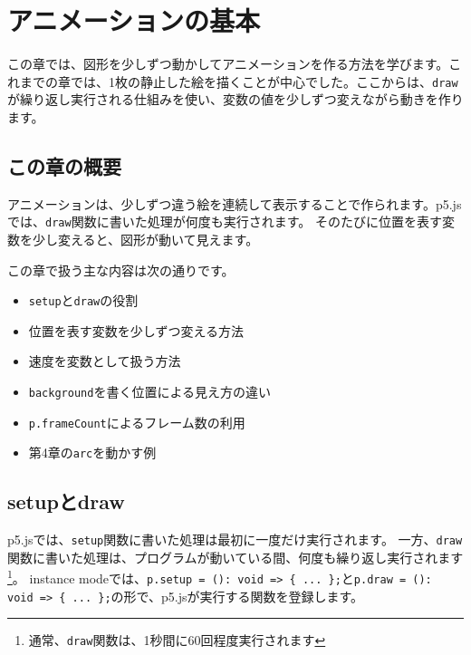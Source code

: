 \chapter{アニメーションの基本}
\label{chap:animation-basics}

この章では、図形を少しずつ動かしてアニメーションを作る方法を学びます。これまでの章では、1枚の静止した絵を描くことが中心でした。ここからは、\texttt{draw}が繰り返し実行される仕組みを使い、変数の値を少しずつ変えながら動きを作ります。

\section{この章の概要}

アニメーションは、少しずつ違う絵を連続して表示することで作られます。p5.jsでは、\texttt{draw}関数に書いた処理が何度も実行されます。
そのたびに位置を表す変数を少し変えると、図形が動いて見えます。

この章で扱う主な内容は次の通りです。

\begin{itemize}
    \item \texttt{setup}と\texttt{draw}の役割
    \item 位置を表す変数を少しずつ変える方法
    \item 速度を変数として扱う方法
    \item \texttt{background}を書く位置による見え方の違い
    \item \texttt{p.frameCount}によるフレーム数の利用
    \item 第4章の\texttt{arc}を動かす例
\end{itemize}

\section{setupとdraw}

p5.jsでは、\texttt{setup}関数に書いた処理は最初に一度だけ実行されます。
一方、\texttt{draw}関数に書いた処理は、プログラムが動いている間、何度も繰り返し実行されます\footnote{通常、\texttt{draw}関数は、1秒間に60回程度実行されます}。
instance modeでは、\texttt{p.setup = (): void => \{ ... \};}と\texttt{p.draw = (): void => \{ ... \};}の形で、p5.jsが実行する関数を登録します。

